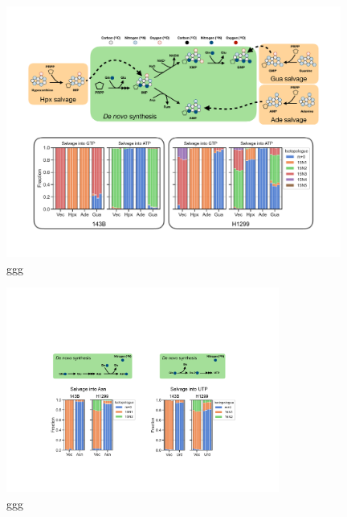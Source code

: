 \begin{figure}
    \centering
    \includegraphics[width=0.98\textwidth]{figures/chap2/sal_frac_pur.pdf}
    \caption[Salvage into purines]{
    ggg
    }
    \label{fig:ch2:sal_frac_pur}
\end{figure}


\begin{figure}
    \centering
    \includegraphics[width=0.8\textwidth]{figures/chap2/sal_frac_pyr-asn.pdf}
    \caption[Salvage into asparagine and pyrimidines]{
    ggg
    }
    \label{fig:ch2:sal_frac_pyr-asn}
\end{figure}









